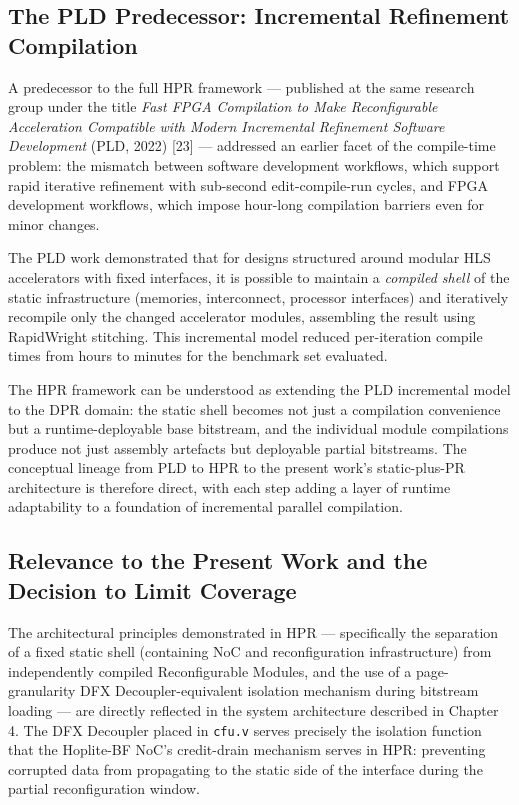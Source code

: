 \subsection{The PLD Predecessor: Incremental Refinement Compilation}

A predecessor to the full HPR framework — published at the same research group under the title \textit{Fast FPGA Compilation to Make Reconfigurable Acceleration Compatible with Modern Incremental Refinement Software Development} (PLD, 2022) [23] — addressed an earlier facet of the compile-time problem: the mismatch between software development workflows, which support rapid iterative refinement with sub-second edit-compile-run cycles, and FPGA development workflows, which impose hour-long compilation barriers even for minor changes.

The PLD work demonstrated that for designs structured around modular HLS accelerators with fixed interfaces, it is possible to maintain a \textit{compiled shell} of the static infrastructure (memories, interconnect, processor interfaces) and iteratively recompile only the changed accelerator modules, assembling the result using RapidWright stitching. This incremental model reduced per-iteration compile times from hours to minutes for the benchmark set evaluated.

The HPR framework can be understood as extending the PLD incremental model to the DPR domain: the static shell becomes not just a compilation convenience but a runtime-deployable base bitstream, and the individual module compilations produce not just assembly artefacts but deployable partial bitstreams. The conceptual lineage from PLD to HPR to the present work's static-plus-PR architecture is therefore direct, with each step adding a layer of runtime adaptability to a foundation of incremental parallel compilation.

\subsection{Relevance to the Present Work and the Decision to Limit Coverage}

The architectural principles demonstrated in HPR — specifically the separation of a fixed static shell (containing NoC and reconfiguration infrastructure) from independently compiled Reconfigurable Modules, and the use of a page-granularity DFX Decoupler-equivalent isolation mechanism during bitstream loading — are directly reflected in the system architecture described in Chapter 4. The DFX Decoupler placed in \texttt{cfu.v} serves precisely the isolation function that the Hoplite-BF NoC's credit-drain mechanism serves in HPR: preventing corrupted data from propagating to the static side of the interface during the partial reconfiguration window.

